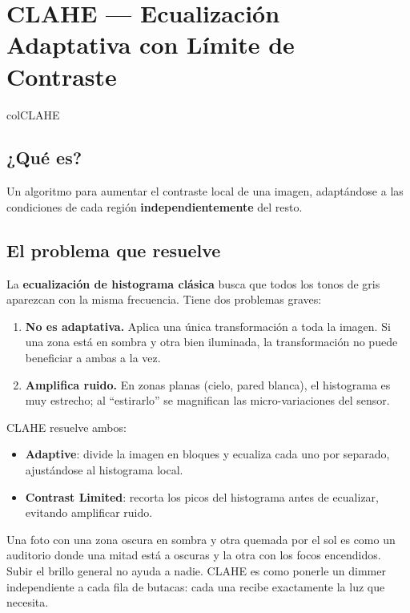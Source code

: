 \documentclass[11pt,a4paper]{article}
\begin{document}
\section{\textcolor{colCLAHE}{CLAHE} — Ecualización Adaptativa con Límite de Contraste}
\begin{keybox}{colCLAHE}

\subsection*{¿Qué es?}

Un algoritmo para aumentar el contraste local de una imagen, adaptándose a
las condiciones de cada región \textbf{independientemente} del resto.

\subsection*{El problema que resuelve}

La \textbf{ecualización de histograma clásica} busca que todos los tonos de
gris aparezcan con la misma frecuencia. Tiene dos problemas graves:

\begin{enumerate}
    \item \textbf{No es adaptativa.} Aplica una única transformación a toda
          la imagen. Si una zona está en sombra y otra bien iluminada, la
          transformación no puede beneficiar a ambas a la vez.
    \item \textbf{Amplifica ruido.} En zonas planas (cielo, pared blanca), el
          histograma es muy estrecho; al ``estirarlo'' se magnifican las
          micro-variaciones del sensor.
\end{enumerate}

CLAHE resuelve ambos:
\begin{itemize}
    \item \textbf{Adaptive}: divide la imagen en bloques y ecualiza cada uno
          por separado, ajustándose al histograma local.
    \item \textbf{Contrast Limited}: recorta los picos del histograma antes de
          ecualizar, evitando amplificar ruido.
\end{itemize}

\begin{analogy}
Una foto con una zona oscura en sombra y otra quemada por el sol es como un
auditorio donde una mitad está a oscuras y la otra con los focos encendidos.
Subir el brillo general no ayuda a nadie. CLAHE es como ponerle un dimmer
independiente a cada fila de butacas: cada una recibe exactamente la luz
que necesita.
\end{analogy}


\end{keybox}
\end{document}
